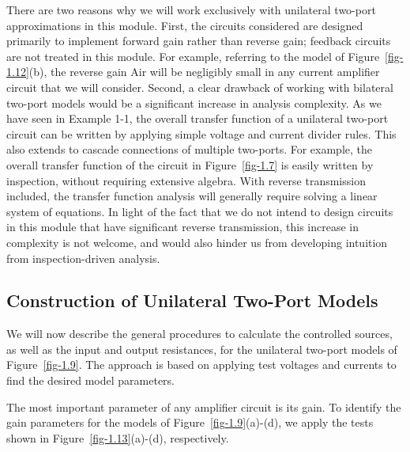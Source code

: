 \documentclass[
  11pt,
  letterpaper,
  abstract]{scrbook}
\begin{document}
There are two reasons why we will work exclusively with unilateral
two-port approximations in this module. First, the circuits considered
are designed primarily to implement forward gain rather than reverse
gain; feedback circuits are not treated in this module. For example,
referring to the model of Figure~\ref{fig-1.12}(b), the reverse gain Air
will be negligibly small in any current amplifier circuit that we will
consider. Second, a clear drawback of working with bilateral two-port
models would be a significant increase in analysis complexity. As we
have seen in Example 1-1, the overall transfer function of a unilateral
two-port circuit can be written by applying simple voltage and current
divider rules. This also extends to cascade connections of multiple
two-ports. For example, the overall transfer function of the circuit in
Figure~\ref{fig-1.7} is easily written by inspection, without requiring
extensive algebra. With reverse transmission included, the transfer
function analysis will generally require solving a linear system of
equations. In light of the fact that we do not intend to design circuits
in this module that have significant reverse transmission, this increase
in complexity is not welcome, and would also hinder us from developing
intuition from inspection-driven analysis.

\subsection{Construction of Unilateral Two-Port
Models}\label{construction-of-unilateral-two-port-models}

We will now describe the general procedures to calculate the controlled
sources, as well as the input and output resistances, for the unilateral
two-port models of Figure~\ref{fig-1.9}. The approach is based on
applying test voltages and currents to find the desired model
parameters.

The most important parameter of any amplifier circuit is its gain. To
identify the gain parameters for the models of
Figure~\ref{fig-1.9}(a)-(d), we apply the tests shown in
Figure~\ref{fig-1.13}(a)-(d), respectively.
\end{document}
